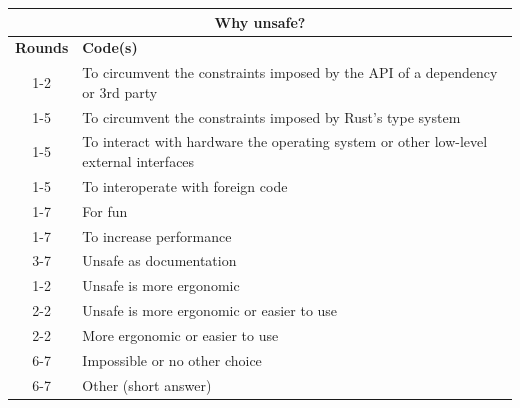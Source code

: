 \centering
\small
\begin{tabular}{|cp{10cm}|}
\hline
\multicolumn{2}{|c|}{\textbf{Why unsafe?}}                                                                                                                              \\ \hline
\multicolumn{1}{|c|}{\textbf{Rounds}} & \textbf{Code(s)} \\ \hline
\multicolumn{1}{|c|}{1-2}    & To circumvent the constraints imposed by the API of a dependency or 3rd party                                                            \\ \hline
\multicolumn{1}{|c|}{1-5}    & To circumvent the constraints imposed by Rust's type system                                                                              \\ \hline
\multicolumn{1}{|c|}{1-5}    & To interact with hardware the operating system or other low-level external interfaces                                                    \\ \hline
\multicolumn{1}{|c|}{1-5}    & To interoperate with foreign code                                                                                                        \\ \hline
\multicolumn{1}{|c|}{1-7}    & For fun                                                                                                                                  \\ \hline
\multicolumn{1}{|c|}{1-7}    & To increase performance                                                                                                                  \\ \hline
\multicolumn{1}{|c|}{3-7}    & Unsafe as documentation                                                                                                                  \\ \hline
\multicolumn{1}{|c|}{1-2}    & Unsafe is more ergonomic                                                                                                                 \\ \cline{2-2} 
\multicolumn{1}{|c|}{3-5}    & Unsafe is more ergonomic or easier to use                                                                                                \\ \cline{2-2} 
\multicolumn{1}{|c|}{6-7}    & More ergonomic or easier to use                                                                                                          \\ \hline
\multicolumn{1}{|c|}{6-7}    & Impossible or no other choice                                                                                                            \\ \hline
\multicolumn{1}{|c|}{6-7}    & Other (short answer)                                                                                                                     \\ \hline
\end{tabular}
